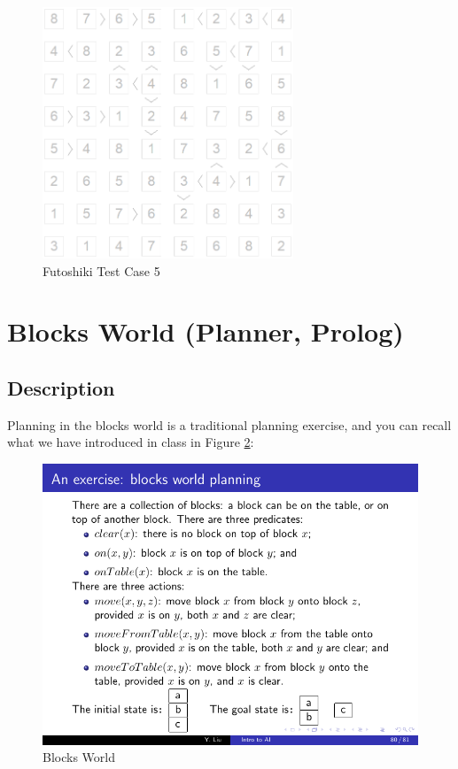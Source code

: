 ﻿\documentclass[a4paper, 11pt]{article}
\begin{document}
\begin{enumerate}
\begin{figure}[htbp]
    \qquad
    \includegraphics[width=7.5cm]{Pic/f5s}
    \caption{Futoshiki Test Case 5}
    \label{fig:case55}
  \end{figure}

\end{enumerate}

\section{Blocks World (Planner, Prolog)}
\subsection{Description}
Planning in the blocks world is a traditional planning exercise, and you can recall what we have introduced in class in Figure \ref{fig:blocks}:
\begin{figure}[ht]
\centering
\includegraphics[width=13cm]{Pic/blocks}
\caption{Blocks World}
\label{fig:blocks}
\end{figure}
\end{document}

